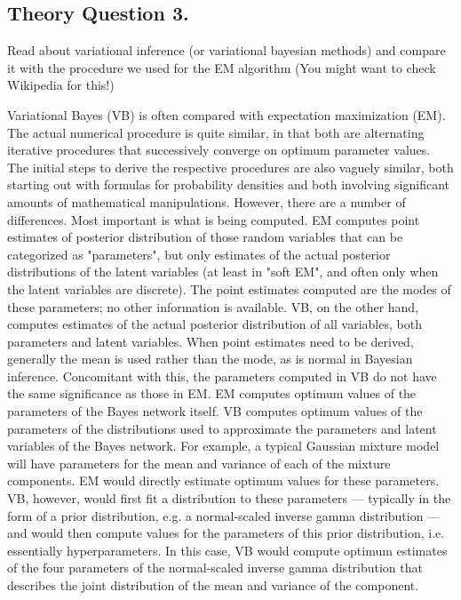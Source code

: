\documentclass[12pt]{article}
\begin{document}
\subsection{Theory Question 3.}
Read about variational inference (or variational bayesian methods) and compare it with the procedure we used for the EM algorithm (You might want to check Wikipedia for this!)
\begin{qsolve}[solution]
    Variational Bayes (VB) is often compared with expectation maximization (EM). The actual numerical procedure is quite similar, in that both are alternating iterative procedures that successively converge on optimum parameter values. The initial steps to derive the respective procedures are also vaguely similar, both starting out with formulas for probability densities and both involving significant amounts of mathematical manipulations. However, there are a number of differences. Most important is what is being computed. EM computes point estimates of posterior distribution of those random variables that can be categorized as "parameters", but only estimates of the actual posterior distributions of the latent variables (at least in "soft EM", and often only when the latent variables are discrete). The point estimates computed are the modes of these parameters; no other information is available. VB, on the other hand, computes estimates of the actual posterior distribution of all variables, both parameters and latent variables. When point estimates need to be derived, generally the mean is used rather than the mode, as is normal in Bayesian inference. Concomitant with this, the parameters computed in VB do not have the same significance as those in EM. EM computes optimum values of the parameters of the Bayes network itself. VB computes optimum values of the parameters of the distributions used to approximate the parameters and latent variables of the Bayes network. For example, a typical Gaussian mixture model will have parameters for the mean and variance of each of the mixture components. EM would directly estimate optimum values for these parameters.
    \splitqsolve
    VB, however, would first fit a distribution to these parameters — typically in the form of a prior distribution, e.g. a normal-scaled inverse gamma distribution — and would then compute values for the parameters of this prior distribution, i.e. essentially hyperparameters. In this case, VB would compute optimum estimates of the four parameters of the normal-scaled inverse gamma distribution that describes the joint distribution of the mean and variance of the component.
\end{qsolve}
\end{document}
